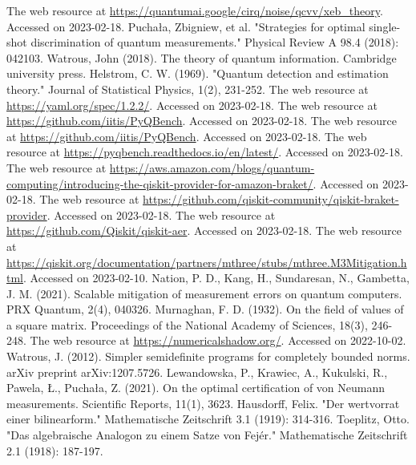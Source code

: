 \documentclass[preprint,12pt, a4paper, dvipsnames]{elsarticle}
\newcommand{\1}{{\rm 1\hspace{-0.9mm}l}}
\theoremstyle{definition}
\begin{document}
\begin{thebibliography}{00}
 The web resource at
\url{https://quantumai.google/cirq/noise/qcvv/xeb_theory}.  Accessed on 2023-02-18.
%
 Puchała, Zbigniew, et al. "Strategies for
optimal single-shot discrimination of quantum measurements." Physical Review A
98.4 (2018): 042103.
 Watrous, John (2018). The theory of quantum information. Cambridge university press.
 Helstrom, C. W. (1969). "Quantum detection and estimation theory." Journal of Statistical Physics, 1(2), 231-252.
 The web resource at \url{https://yaml.org/spec/1.2.2/}. Accessed on 2023-02-18.
 The web resource at \url{https://github.com/iitis/PyQBench}. Accessed on 2023-02-18.
 The web resource at \url{https://github.com/iitis/PyQBench}. Accessed on 2023-02-18.
 The web resource at \url{https://pyqbench.readthedocs.io/en/latest/}. Accessed on 2023-02-18.
 The web resource at \url{https://aws.amazon.com/blogs/quantum-computing/introducing-the-qiskit-provider-for-amazon-braket/}. Accessed on 2023-02-18.
 The web resource at \url{https://github.com/qiskit-community/qiskit-braket-provider}. Accessed on 2023-02-18.
 The web resource at \url{https://github.com/Qiskit/qiskit-aer}. Accessed on 2023-02-18.
 The web resource at \url{https://qiskit.org/documentation/partners/mthree/stubs/mthree.M3Mitigation.html}. Accessed on 2023-02-10.
 Nation, P. D., Kang, H., Sundaresan, N.,  Gambetta, J. M. (2021). Scalable mitigation of measurement errors on quantum computers. PRX Quantum, 2(4), 040326.
 Murnaghan, F. D. (1932). On the field of values of a square matrix. Proceedings of the National Academy of Sciences, 18(3), 246-248.
 The web resource at \url{https://numericalshadow.org/}. Accessed on 2022-10-02.
 Watrous, J. (2012). Simpler semidefinite programs for completely bounded norms. arXiv preprint arXiv:1207.5726.
 Lewandowska, P., Krawiec, A., Kukulski, R., Pawela, Ł.,  Puchała, Z. (2021). On the optimal certification of von Neumann measurements. Scientific Reports, 11(1), 3623.
 Hausdorff, Felix. "Der wertvorrat einer bilinearform." Mathematische Zeitschrift 3.1 (1919): 314-316.
 Toeplitz, Otto. "Das algebraische Analogon zu einem Satze von Fejér." Mathematische Zeitschrift 2.1 (1918): 187-197.



















\end{thebibliography}
\end{document}
